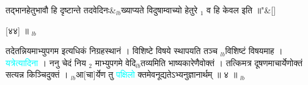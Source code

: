 \documentclass[article,12pt,a4paper]{memoir}%
\newcommand{\quotelemma}[1]{\textcolor{cyan}{#1}}
\newcounter{parCount}
\begin{document}
	    \pend%
	  
	    
	    \stanza[\smallbreak]
	  तद्भानहेतुभावौ हि दृष्टान्ते तदवेदिनः&{\tiny $_{lb}$}ख्याप्यते विदुषाम्वाच्यो हेतुरे {\tiny $_{1}$} व हि केवल इति ॥{\normalfontlatin\large\qquad{}"}\&[\smallbreak]
	  
	  
	  
	    \pstart  \leavevmode%
	    \hphantom{.}
	   [४४] ॥
	{}
	\pend%
      {\tiny $_{lb}$}

	  
	  \pstart \leavevmode%
	तदेतन्नियमाभ्युपगम इत्यधिकं निग्रहस्थानं । विशिष्टे विषये स्थापयति तञ्च {\tiny $_{lb}$}विशिष्टं विषयमाह । \quotelemma{यत्रेत्यादिना} \cite[15b5]{vn-msN} । ननु चेदं निय {\tiny $_{2}$} माभ्युपगमे वेदि{\tiny $_{lb}$}तव्यमिति भाष्यकारेणैवोक्तं । तत्किमत्र दूषणमाचार्येणोक्तं सत्यन्न किञ्चिदुक्तं । {\tiny $_{lb}$}आ[चा]र्येण तु \quotelemma{पक्षिलो} क्तमेवनूद्यतेऽभ्यनुज्ञानार्थम् ॥ ४ ॥
	{}
	\pend%
      {\tiny $_{lb}$}
\end{document}
